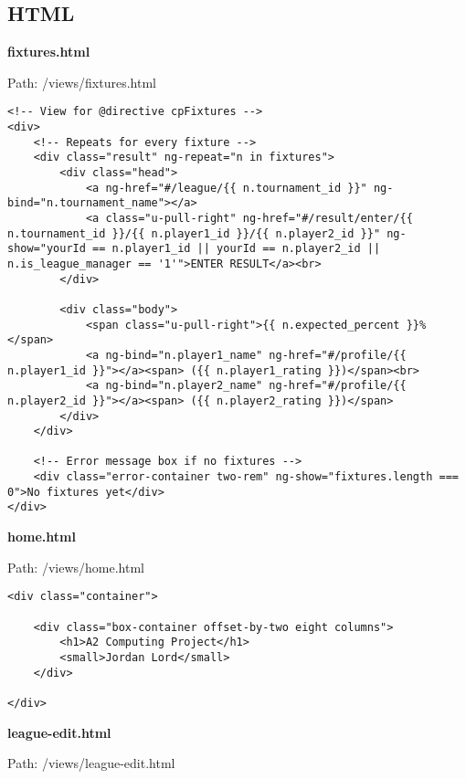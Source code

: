 \subsection{HTML}
\textbf{fixtures.html}\label{fixtures.html}

Path: /views/fixtures.html

{\scriptsize
\begin{lstlisting}
<!-- View for @directive cpFixtures -->
<div>
	<!-- Repeats for every fixture -->
	<div class="result" ng-repeat="n in fixtures">
		<div class="head">
			<a ng-href="#/league/{{ n.tournament_id }}" ng-bind="n.tournament_name"></a>
			<a class="u-pull-right" ng-href="#/result/enter/{{ n.tournament_id }}/{{ n.player1_id }}/{{ n.player2_id }}" ng-show="yourId == n.player1_id || yourId == n.player2_id || n.is_league_manager == '1'">ENTER RESULT</a><br>
		</div>

		<div class="body">
			<span class="u-pull-right">{{ n.expected_percent }}%</span>
			<a ng-bind="n.player1_name" ng-href="#/profile/{{ n.player1_id }}"></a><span> ({{ n.player1_rating }})</span><br>
			<a ng-bind="n.player2_name" ng-href="#/profile/{{ n.player2_id }}"></a><span> ({{ n.player2_rating }})</span>
		</div>
	</div>

	<!-- Error message box if no fixtures -->
	<div class="error-container two-rem" ng-show="fixtures.length === 0">No fixtures yet</div>
</div>\end{lstlisting}
}
\textbf{home.html}\label{home.html}

Path: /views/home.html

{\scriptsize
\begin{lstlisting}
<div class="container">

	<div class="box-container offset-by-two eight columns">
		<h1>A2 Computing Project</h1>
		<small>Jordan Lord</small>
	</div>

</div>\end{lstlisting}
}
\textbf{league-edit.html}\label{league-edit.html}

Path: /views/league-edit.html

